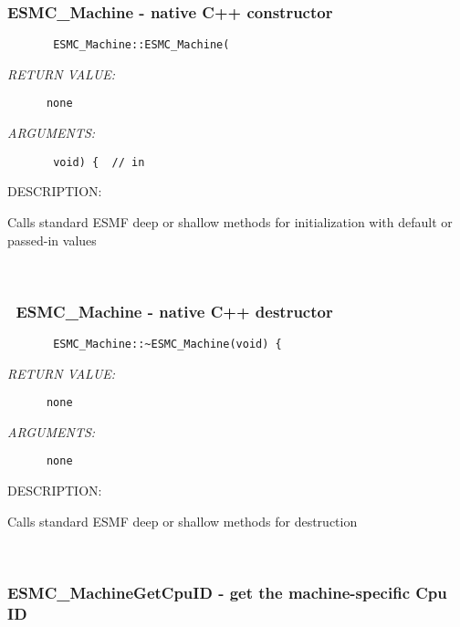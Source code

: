 \subsubsection{ESMC\_Machine - native C++ constructor}


  
\begin{verbatim}       ESMC_Machine::ESMC_Machine(\end{verbatim}{\em RETURN VALUE:}
\begin{verbatim}      none\end{verbatim}{\em ARGUMENTS:}
\begin{verbatim}       void) {  // in\end{verbatim}
{\sf DESCRIPTION:\\ }


        Calls standard ESMF deep or shallow methods for initialization
        with default or passed-in values
   
 
\mbox{}\hrulefill\ 
 
\subsubsection{~ESMC\_Machine - native C++ destructor}


  
\begin{verbatim}       ESMC_Machine::~ESMC_Machine(void) {\end{verbatim}{\em RETURN VALUE:}
\begin{verbatim}      none\end{verbatim}{\em ARGUMENTS:}
\begin{verbatim}      none\end{verbatim}
{\sf DESCRIPTION:\\ }


        Calls standard ESMF deep or shallow methods for destruction
   
 
\mbox{}\hrulefill\ 
 
\subsubsection{ESMC\_MachineGetCpuID - get the machine-specific Cpu ID}


